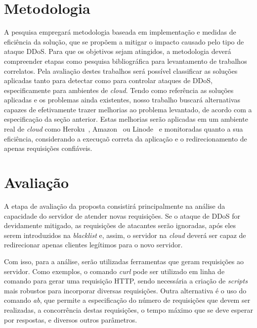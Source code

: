 \documentclass[a4paper, 11pt]{article}
\begin{document}
\section{Metodologia}
A pesquisa empregar\'a metodologia baseada em implementa\c{c}\~{a}o e medidas de
efici\^encia da solu\c{c}\~{a}o, que se propõem a mitigar o impacto causado pelo
tipo de ataque DDoS. Para que os objetivos sejam atingidos, a metodologia
dever\'a
compreender etapas como pesquisa bibliogr\'afica para levantamento de trabalhos
correlatos. Pela avalia\c{c}\~{a}o destes trabalhos ser\'a poss\'ivel
classificar as
solu\c{c}\~oes aplicadas tanto para detectar como para controlar ataques de
DDoS,
especificamente para ambientes de \emph{cloud}. Tendo como refer\^encia as
solu\c{c}\~oes aplicadas e os problemas ainda existentes, nosso trabalho
buscar\'a
alternativas capazes de efetivamente trazer melhorias ao problema levantado,
de acordo com a especificação da seção anterior.
Estas melhorias ser\~ao aplicadas em um ambiente real de \emph{cloud} como
Heroku~\cite{heroku}, Amazon~\cite{amazon}
ou Linode~\cite{linode} e monitoradas quanto a sua efici\^encia, considerando a
execu\c{c}a\~o correta da aplica\c{c}\~{a}o e o redirecionamento de apenas
requisições
confi\'aveis.




\section{Avalia\c{c}\~{a}o}
A etapa de avalia\c{c}\~{a}o da proposta consistirá principalmente na análise
da capacidade do servidor de atender novas requisições. Se o ataque de DDoS for devidamente
mitigado, as requisições de atacantes serão ignoradas, após eles serem introduzidos na \emph{blacklist}
e, assim, o servidor na \emph{cloud} deverá ser capaz de redirecionar apenas clientes legítimos 
para o novo servidor.

Com isso, para a análise, serão utilizadas ferramentas que geram requisições ao servidor. Como exemplos, o comando 
\emph{curl} pode ser utilizado em linha de comando para gerar uma requisição HTTP, sendo necessária a criação de \emph{scripts} mais robustos para incorporar diversas requisições. Outra alternativa é o uso do comando \emph{ab}, que permite a especificação do número de requisições que devem ser realizadas, a concorrência destas requisições, o tempo máximo que se deve esperar por respostas, e diversos outros parâmetros.
\end{document}
